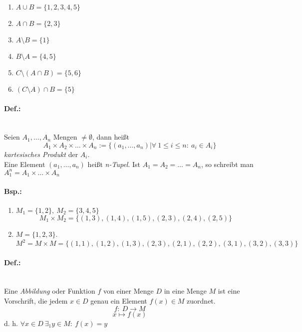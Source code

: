 \documentclass[11pt,a4paper,oneside]{article}
\begin{document}
{  \begin{enumerate}
    \item $A \cup B = \{1,2,3,4,5\}$
    \item $A \cap B = \{2,3\}$
    \item $A \setminus B = \{1\}$
    \item $B \setminus A = \{4,5\}$
    \item $C \setminus (A \cap B) = \{5,6\}$
    \item $(C \setminus A) \cap B = \{5\}$
  \end{enumerate}

\paragraph{Def.:}\mbox{}\\
  Seien $A_1, \ldots, A_n$ Mengen $\neq \emptyset$, dann heißt
  \[A_1 \times A_2 \times \ldots \times A_n := \{(a_1, \ldots, a_n) | \forall \: 1 \leq i \leq n: \: a_i \in A_i\}\]
  \emph{kartesisches Produkt} der $A_i$.\\[10pt]
  Eine Element $(a_1, \ldots, a_n)$ heißt \emph{n-Tupel}. Ist $A_1 = A_2 = \ldots = A_n$, so schreibt man
  $A_1^n = A_1 \times \ldots \times A_n$

\paragraph{Bsp.:}
  \begin{enumerate}
    \item $M_1 = \{1, 2\}, \: M_2=\{3, 4, 5\}$
      \[M_1 \times M_2 = \{(1,3), (1,4), (1,5), (2,3), (2,4), (2,5)\}\]
    \item $M = \{1,2,3\}$.
      \[M^2 = M \times M = \{(1,1), (1,2), (1,3), (2,3), (2,1), (2,2), (3,1), (3,2), (3,3)\}\]
  \end{enumerate}

\paragraph{Def.:}\mbox{}\\
  Eine \emph{Abbildung} oder Funktion $f$ von einer Menge $D$ in eine Menge $M$ ist
  eine Vorschrift, die jedem $x \in D$ genau ein Element $f(x) \in M$ zuordnet.
  \[f: \: D \to M\]
  \[x \mapsto f(x)\]
  d. h. $\forall x \in D \: \exists_1 y \in M: \: f(x) = y$

}
\end{document}
